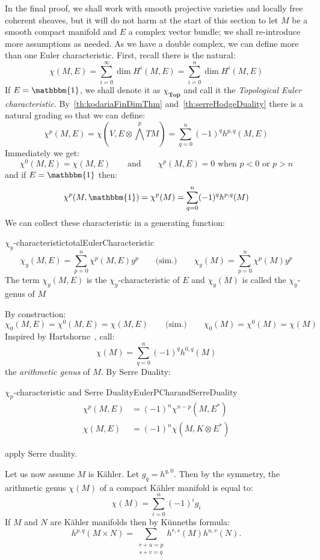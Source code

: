 \documentclass{book}
\newcommand{\Top}{{\textbf{Top}}}
\begin{document}
In the final proof, we shall work with smooth projective varieties and locally free coherent sheaves, but it
will do not harm at the start of this section to let $M$ be a smooth compact manifold and $E$ a complex vector
bundle; we shall re-introduce more assumptions as needed. As we have a double complex, we can define more than
one Euler characteristic. First, recall there is the natural:
\[
  \chi(M,E) = \sum_{i=0}^\infty \dim H^i(M,E) = \sum_{i=0}^n \dim H^i(M,E)
\]
If $E = \mathbbm{1}$, we shall denote it as $\chi_\Top$ and call it the \emph{Topological Euler
characteristic}. By~\cref{th:kodariaFinDimThm} and~\cref{th:serreHodgeDuality} there is a natural grading so
that we can define:
\[
  \chi^p(M,E) = \chi\left(V, E\otimes \bigwedge^p TM\right) = \sum_{q=0}^n (-1)^q h^{p,q}(M,E)
\]
Immediately we get:
\[
  \chi^0(M,E) = \chi(M,E) \qquad \text{and} \qquad \chi^p(M,E) = 0\text{ when $p < 0$ or $p > n$}
\]
and if $E = \mathbbm{1}$ then:
\[
  \chi^p(M,\mathbbm{1}) = \chi^p(M) = \sum_{q=0}^n (-1)^q h^{p,q}(M)
\]
We can collect these characteristic in a generating function:
\begin{defn}{$\chi_y$-characteristic}{totalEulerCharacteristic}
    \[
    \chi_y(M,E) = \sum_{p=0}^n \chi^p(M,E)y^p \qquad \text{(sim.)} \qquad \chi_y(M) = \sum_{p=0}^n \chi^p(M)y^p
  \]
  The term $\chi_y(M,E)$ is the $\chi_y$-characteristic of $E$ and $\chi_y(M)$ is called the $\chi_y$-genus of
  $M$
\end{defn}

By construction:
\[
  \chi_0(M,E) = \chi^0(M,E) = \chi(M,E) \qquad \text{(sim.)} \qquad \chi_0(M) = \chi^0(M) = \chi(M)
\]
Inspired by Hartshorne~\cite{hartshorneAlgebraicGeometry2013}, call:
\[
  \chi(M) = \sum_{q=0}^n (-1)^q h^{0,q}(M)
\]
the \emph{arithmetic genus} of $M$. By Serre Duality:
\begin{prop}{$\chi_p$-characteristic and Serre Duality}{EulerPCharandSerreDuality}
  \begin{align*}
  \chi^p(M,E) &= (-1)^n \chi^{n-p}(M, E^*)\\
  \chi(M,E)&= (-1)^n \chi(M, K\otimes E^*)
\end{align*}
\end{prop}

\begin{Proof}
 apply Serre duality.
\end{Proof}


Let us now assume $M$ is K\"ahler. Let $g_q = h^{q,0}$. Then by the symmetry, the arithmetic genus $\chi(M)$
of a compact K\"ahler manifold is equal to:
\[
  \chi(M) = \sum_{i=0}^n (-1)^ig_i
\]
If $M$ and $N$ are K\"ahler manifolds then by K\"unneths formula:
\[
    h^{p,q}(M \times N) = \sum_{\substack{r+u=p \\ s+v=q}} h^{r,s}(M) h^{u,v}(N).
\]
\end{document}
